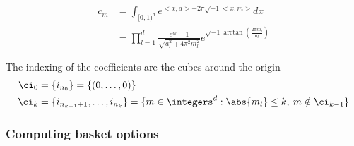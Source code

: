 \documentclass[final]{elsarticle}
\theoremstyle{definition}
\theoremstyle{remark}
\begin{document}
\begin{align*}
c_m&=\int_{[0,1)^d}e^{<x,a>-2\pi\sqrt{-1}<x,m>}dx\\
    &=\prod_{l=1}^{d}\frac{e^{a_l}-1}{\sqrt{a_l^2+4\pi^2m_l^2}}e^{\sqrt{-1}\arctan{\left(\frac{2\pi m_l}{a_l}\right)}}
\end{align*}

The indexing of the coefficients are the cubes around the origin
\begin{align*}
\ci_0&=\{i_{n_0}\}=\{(0,\dots,0)\} \\
\ci_k&=\{i_{n_{k-1}+1},\dots,i_{n_k}\}=\{m\in\integers^d: \abs{m_l} \le k,\: m\notin \ci_{k-1}\}
\end{align*}

\subsubsection{Computing basket options}




\end{document}

